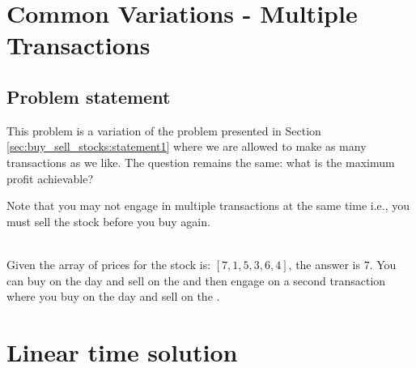\section{Common Variations - Multiple Transactions}
\label{sec:buy_sell_stocks:multiple_transaction}

\subsection{Problem statement}
\begin{exercise}
This problem is a variation of the problem presented in Section \ref{sec:buy_sell_stocks:statement1} where we are allowed to make as many transactions as we like. The question remains the same: what is the maximum profit achievable?

Note that you may not engage in multiple transactions at the same time i.e., you must sell the stock before you buy again.

	\begin{example}
		\hfill \\
		Given the array of prices for the stock is: $[7,1,5,3,6,4]$, the answer is $7$. 
		You can buy on the  day and sell on the  and then engage on a second transaction where you buy on the  day and sell on the .
	\end{example}

\end{exercise}


\section{Linear time solution}
\label{buy_sell_stocks_2:sec:linear}

